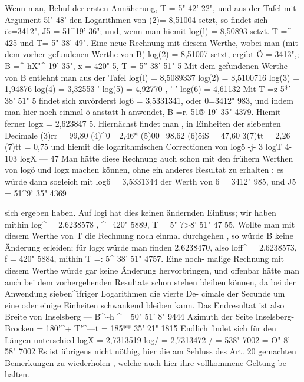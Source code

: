 \documentclass[12pt,a4paper]{article}
\begin{document}
Wenn  man,  Behuf  der  ersten  Annäherung,  T  =  5"  42'  22",  und  aus  der Tafel  mit  Argument  5l"  48'  den  Logarithmen  von  (2)=  8,51004  setzt,  so  findet sich  ö:=3412",  J5  =  51\^{}19' 36";  und,  wenn  man  hiemit  log(l)  =  8,50893  setzt. T  =\^{}  425  und  T=  5"  38'  49".  Eine  neue  Rechnung  mit  diesem  Werthe,  wobei man  (mit  dem  vorher  gefundenen  Werthe  von  B)    log(2)  =  8,51007   setzt,  ergibt Ö  =  3413",;    B  =\^{}  hX"\^{}   19'   35",      x  =  420"   5,      T  =  5''  38'   51"   5 Mit  dem  gefundenen  Werthe  von  B  entlehnt  man  aus  der  Tafel log(l)  =  8,5089337 log(2)  =  8,5100716 log(3)  =  1,94876 log(4)  =  3,32553  ' log(5)  =  4,92770 ,      '  '       log(6)  =  4,61132 Mit  T  =z  5*'  38'  51"  5  findet  sich  zuvörderst  log6  =  3,5331341,  oder 0=3412"  983,  und  indem  man  hier  noch  einmal  ö  anstatt  h  anwendet, B  =r.  51®  19'  35"  4379.  Hiemit  ferner  logx  =  2,623847  5.  Hiernächst  findet man ,  in  Einheiten  der  siebenten  Decimale (3)rr  =  99,80 (4)\^{}0=  2,46* (5)00=98,62 (6)öiS  =  47,60 3(7)tt  =  2,26 (7)tt   =     0,75 und  hiemit  die  logarithmischen  Correctionen von     logö -j-      3 logT 4-103 logX ---    47 Man  hätte  diese  Rechnung  auch  schon  mit  den  frühern  Werthen  von  logö  und  logx machen  können,  ohne  ein  anderes  Resultat  zu  erhalten ;  es  würde  dann  sogleich  mit log6  =  3,5331344    der  Werth  von   6  =  3412"  985,    und   J5  =  51\^{}9' 35"  4369

sich  ergeben  haben.  Auf  logi  hat  dies  keinen  ändernden  Einfluss;  wir  haben mithin  log\^{}  =  2,6238578  ,  \^{}=420"  5889,  T  =  5"  ?>8' 51"  47  55.  Wollte  man mit  diesem  Werthe  von  T  die  Rechnung  noch  einmal  durchgehen ,  so  würde B  keine  Änderung  erleiden;  für  logx  würde  man  finden  2,6238470,  also loff\^{}  =  2,6238573,  f  =  420"  5884,  mithin  T  =:  5\^{}  38' 51"  4757.  Eine  noch- malige  Rechnung  mit  diesem  Werthe  würde  gar  keine  Änderung  hervorbringen, und  offenbar  hätte  man  auch  bei  dem  vorhergehenden  Resultate  schon  stehen bleiben  können,  da  bei  der  Anwendung  sieben\^{}ifriger  Logarithmen  die  vierte  De- cimale  der  Secunde  um  eine  oder  einige  Einheiten  schwankend  bleiben  kann. Das  Endresultat  ist  also Breite  von  Inselsberg    ---  B\^{}\textasciitilde{}h  \^{}=  50"  51'  8"  9444 Azimuth  der  Seite  Inselsberg- Brocken    =  180'\^{}+  T'\^{}---t =  185**  35'  21"  1815 Endlich  findet  sich  für  den  Längen  unterschied logX  =  2,7313519 log/  =  2,7313472 /  =  538"  7002  =  O"  8'  58"  7002 Es  ist  übrigens  nicht  nöthig,  hier  die  am  Sehluss  des  Art.  20  gemachten Bemerkungen  zu  wiederholen ,  welche  auch  hier  ihre  vollkommene  Geltung  be- halten.
\end{document}
